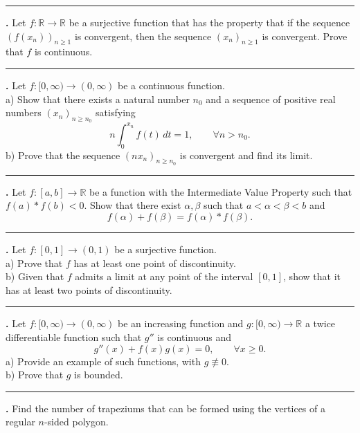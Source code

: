 \documentclass[11pt]{article}
\newcounter{probnum}
\newenvironment{problembox}{\par\noindent\rule{\linewidth}{0.5pt}\vspace{5pt}\par}{\vspace{2pt}}
\begin{document}
\begin{problembox}
\textbf{\theprobnum.} Let $f : \mathbb{R} \to \mathbb{R}$ be a surjective function that has the property that if the sequence $(f(x_n))_{n \ge 1}$ is convergent, then the sequence $(x_n)_{n \ge 1}$ is convergent. Prove that $f$ is continuous.
\end{problembox}

\begin{problembox}
\textbf{\theprobnum.} Let $f : [0,\infty) \to (0,\infty)$ be a continuous function.\\
a) Show that there exists a natural number $n_0$ and a sequence of positive real numbers $(x_n)_{n \ge n_0}$ satisfying
\[
n \int_0^{x_n} f(t)\,dt = 1, \qquad \forall n > n_0.
\]
b) Prove that the sequence $(n x_n)_{n \ge n_0}$ is convergent and find its limit.
\end{problembox}

\begin{problembox}
\textbf{\theprobnum.} Let $f : [a,b] \to \mathbb{R}$ be a function with the Intermediate Value Property such that $f(a) \ast f(b) < 0$. Show that there exist $\alpha, \beta$ such that $a < \alpha < \beta < b$ and
\[
f(\alpha) + f(\beta) = f(\alpha) \ast f(\beta).
\]
\end{problembox}

\begin{problembox}
\textbf{\theprobnum.} Let $f : [0,1] \to (0,1)$ be a surjective function.\\
a) Prove that $f$ has at least one point of discontinuity.\\
b) Given that $f$ admits a limit at any point of the interval $[0,1]$, show that it has at least two points of discontinuity.
\end{problembox}

\begin{problembox}
\textbf{\theprobnum.} Let $f : [0,\infty) \to (0,\infty)$ be an increasing function and $g : [0,\infty) \to \mathbb{R}$ a twice differentiable function such that $g''$ is continuous and
\[
g''(x) + f(x) g(x) = 0, \qquad \forall x \ge 0.
\]
a) Provide an example of such functions, with $g \not\equiv 0$.\\
b) Prove that $g$ is bounded.
\end{problembox}

\begin{problembox}
\textbf{\theprobnum.} Find the number of trapeziums that can be formed using the vertices of a regular $n$-sided polygon.
\end{problembox}
\end{document}
